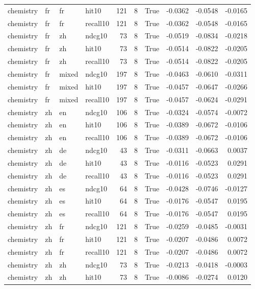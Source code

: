 \begin{tabular}{llllrrrrrr}
chemistry & fr & fr & hit10 & 121 & 8 & True & -0.0362 & -0.0548 & -0.0165 \\
chemistry & fr & fr & recall10 & 121 & 8 & True & -0.0362 & -0.0548 & -0.0165 \\
chemistry & fr & zh & ndcg10 & 73 & 8 & True & -0.0519 & -0.0834 & -0.0218 \\
chemistry & fr & zh & hit10 & 73 & 8 & True & -0.0514 & -0.0822 & -0.0205 \\
chemistry & fr & zh & recall10 & 73 & 8 & True & -0.0514 & -0.0822 & -0.0205 \\
chemistry & fr & mixed & ndcg10 & 197 & 8 & True & -0.0463 & -0.0610 & -0.0311 \\
chemistry & fr & mixed & hit10 & 197 & 8 & True & -0.0457 & -0.0647 & -0.0266 \\
chemistry & fr & mixed & recall10 & 197 & 8 & True & -0.0457 & -0.0624 & -0.0291 \\
chemistry & zh & en & ndcg10 & 106 & 8 & True & -0.0324 & -0.0574 & -0.0072 \\
chemistry & zh & en & hit10 & 106 & 8 & True & -0.0389 & -0.0672 & -0.0106 \\
chemistry & zh & en & recall10 & 106 & 8 & True & -0.0389 & -0.0672 & -0.0106 \\
chemistry & zh & de & ndcg10 & 43 & 8 & True & -0.0311 & -0.0663 & 0.0037 \\
chemistry & zh & de & hit10 & 43 & 8 & True & -0.0116 & -0.0523 & 0.0291 \\
chemistry & zh & de & recall10 & 43 & 8 & True & -0.0116 & -0.0523 & 0.0291 \\
chemistry & zh & es & ndcg10 & 64 & 8 & True & -0.0428 & -0.0746 & -0.0127 \\
chemistry & zh & es & hit10 & 64 & 8 & True & -0.0176 & -0.0547 & 0.0195 \\
chemistry & zh & es & recall10 & 64 & 8 & True & -0.0176 & -0.0547 & 0.0195 \\
chemistry & zh & fr & ndcg10 & 121 & 8 & True & -0.0259 & -0.0485 & -0.0031 \\
chemistry & zh & fr & hit10 & 121 & 8 & True & -0.0207 & -0.0486 & 0.0072 \\
chemistry & zh & fr & recall10 & 121 & 8 & True & -0.0207 & -0.0486 & 0.0072 \\
chemistry & zh & zh & ndcg10 & 73 & 8 & True & -0.0213 & -0.0418 & -0.0003 \\
chemistry & zh & zh & hit10 & 73 & 8 & True & -0.0086 & -0.0274 & 0.0120 \\

\end{tabular}

